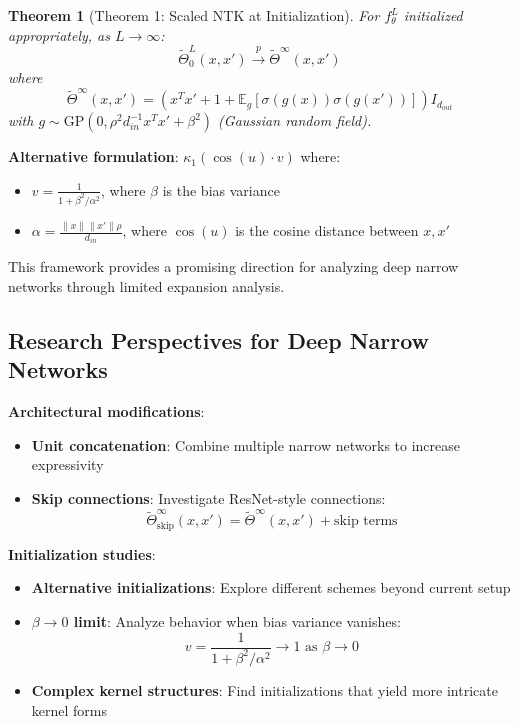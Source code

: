 \documentclass{article}
\newtheorem{theorem}{Theorem}[section]
\newcommand{\E}{\mathbb{E}}
\begin{document}
\begin{theorem}[Theorem 1: Scaled NTK at Initialization]
For $f^L_\theta$ initialized appropriately, as $L \to \infty$:
\[ \tilde{\Theta}^L_0(x, x') \xrightarrow{p} \tilde{\Theta}^\infty(x, x') \]
where
\[ \tilde{\Theta}^\infty(x, x') = (x^T x' + 1 + \E_g[\sigma(g(x))\sigma(g(x'))]) I_{d_{out}} \]
with $g \sim \text{GP}(0, \rho^2 d_{in}^{-1} x^T x' + \beta^2)$ (Gaussian random field).
\end{theorem}

\textbf{Alternative formulation}: $\kappa_1(\cos(u) \cdot v)$ where:
\begin{itemize}
\item $v = \frac{1}{1 + \beta^2/\alpha^2}$, where $\beta$ is the bias variance
\item $\alpha = \frac{\|x\| \|x'\| \rho}{d_{in}}$, where $\cos(u)$ is the cosine distance between $x, x'$
\end{itemize}

This framework provides a promising direction for analyzing deep narrow networks through limited expansion analysis.

\subsection{Research Perspectives for Deep Narrow Networks}

\textbf{Architectural modifications}:
   \begin{itemize}
\item \textbf{Unit concatenation}: Combine multiple narrow networks to increase expressivity
\item \textbf{Skip connections}: Investigate ResNet-style connections:
  \[ \tilde{\Theta}^\infty_{\text{skip}}(x, x') = \tilde{\Theta}^\infty(x, x') + \text{skip terms} \]
   \end{itemize}

\textbf{Initialization studies}:
\begin{itemize}
\item \textbf{Alternative initializations}: Explore different schemes beyond current setup
\item \textbf{$\beta \to 0$ limit}: Analyze behavior when bias variance vanishes:
  \[ v = \frac{1}{1 + \beta^2/\alpha^2} \to 1 \text{ as } \beta \to 0 \]
\item \textbf{Complex kernel structures}: Find initializations that yield more intricate kernel forms
\end{itemize}
\end{document}

